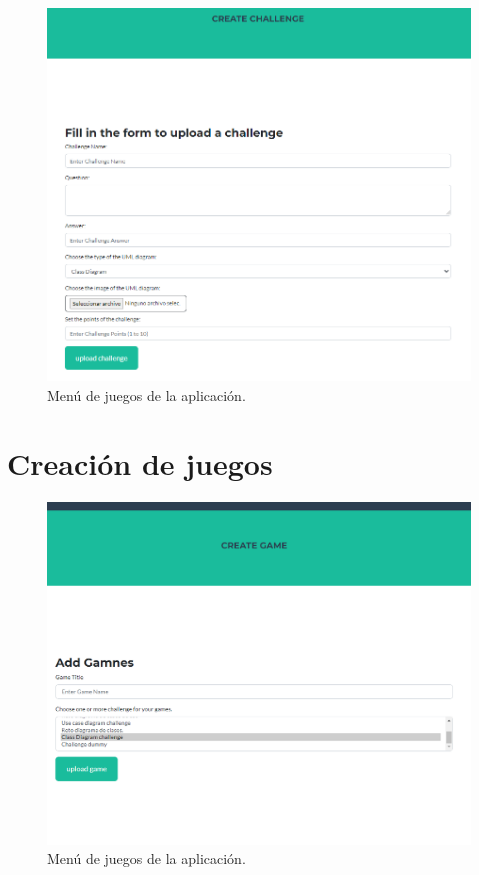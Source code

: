 \documentclass[a4paper, 12pt]{book}
\begin{document}
\begin{figure}
	\centering
	\includegraphics[width=16cm, keepaspectratio]{img/create_challenge_html.png}
	\caption{Menú de juegos de la aplicación.}\label{fig:create_challenge}
\end{figure}

\section{Creación de juegos}

\begin{figure}
	\centering
	\includegraphics[width=16cm, keepaspectratio]{img/create_game_html.png}
	\caption{Menú de juegos de la aplicación.}\label{fig:create_game}
\end{figure}
\end{document}
